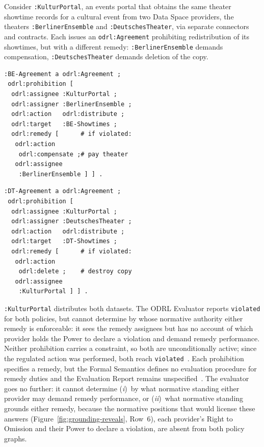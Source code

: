 \documentclass{IOS-Book-Article}
\newcommand{\odrl}[1]{\texttt{odrl:#1}}
\theoremstyle{definition}
\begin{document}
\noindent Consider \texttt{:KulturPortal}, an events portal that obtains the same theater
showtime records for a cultural event from two Data Space providers, the
theaters \texttt{:BerlinerEnsemble} and \texttt{:DeutschesTheater}, via
separate connectors and contracts. Each issues an \odrl{Agreement} prohibiting
redistribution of its showtimes, but with a different remedy:
\texttt{:BerlinerEnsemble} demands compensation, \texttt{:DeutschesTheater}
demands deletion of the copy.
\begin{center}
\begin{minipage}[t]{0.47\columnwidth}
\scriptsize
\begin{verbatim}
:BE-Agreement a odrl:Agreement ;
 odrl:prohibition [
  odrl:assignee :KulturPortal ;
  odrl:assigner :BerlinerEnsemble ;
  odrl:action   odrl:distribute ;
  odrl:target   :BE-Showtimes ;
  odrl:remedy [      # if violated:
   odrl:action
    odrl:compensate ;# pay theater
   odrl:assignee
    :BerlinerEnsemble ] ] .
\end{verbatim}
\end{minipage}%
\vrule\hspace{4pt}%
\begin{minipage}[t]{0.47\columnwidth}
\scriptsize
\begin{verbatim}
:DT-Agreement a odrl:Agreement ;
 odrl:prohibition [
  odrl:assignee :KulturPortal ;
  odrl:assigner :DeutschesTheater ;
  odrl:action   odrl:distribute ;
  odrl:target   :DT-Showtimes ;
  odrl:remedy [      # if violated:
   odrl:action
    odrl:delete ;    # destroy copy
   odrl:assignee
    :KulturPortal ] ] .
\end{verbatim}
\end{minipage}
\end{center}
\texttt{:KulturPortal} distributes both datasets. The ODRL Evaluator reports \texttt{violated} for both
policies, but cannot determine by whose normative
authority either remedy is enforceable: it sees the remedy
assignees but has no account of which provider holds the
Power to declare a violation and demand remedy performance. Neither prohibition carries a constraint, so both are
unconditionally active; since the regulated action was
performed, both reach
\texttt{violated}~\cite{odrl-formal-semantics}.
Each prohibition specifies a remedy, but the Formal
Semantics defines no evaluation procedure for remedy
duties and the Evaluation Report remains
unspecified~\cite{odrl-formal-semantics}.
The evaluator goes no further: it cannot determine
(\emph{i})~by what normative standing either provider
may demand remedy performance, or
(\emph{ii})~what normative standing grounds either remedy,
because the normative positions that would license these
answers (Figure~\ref{fig:grounding-reveals}, Row~6), each
provider's Right to Omission and their Power to declare
a violation, are absent from both policy graphs.
\end{document}
